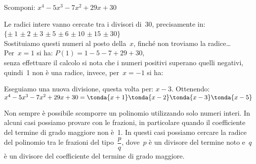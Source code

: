 \begin{esempio}{}{}
Scomponi: \(x^4-5x^3-7x^2+29x+30\)

Le radici intere vanno cercate tra i divisori di~30, precisamente in:\\
\phantom{.}\hfill
\(\{\pm~1\) \(\pm~2\) \(\pm~3\) \(\pm~5\) \(\pm~6\) \(\pm~10\)
\(\pm~15\) \(\pm~30\}\)
\hfill ~\\
Sostituiamo questi numeri al posto della~\(x\), finché non troviamo la 
radice\dots\\
Per~\(x=1\) si ha: \quad \(P(1)=1-5-7+29+30\), \\
senza effettuare il calcolo si nota 
che i numeri positivi superano quelli negativi, quindi~1 non è una radice,
invece, per~\(x=-1\) si ha:


\vspace{.5em}
Eseguiamo una nuova divisione, questa volta per: \(x-3\).
Ottenendo: \\
\(x^4-5x^3-7x^2+29x+30 = \tonda{x+1}\tonda{x-2}\tonda{x-3}\tonda{x-5}\)
\end{esempio}

Non sempre è possibile scomporre un polinomio utilizzando solo numeri
interi. In alcuni casi possiamo provare con le frazioni, in particolare
quando il coefficiente del termine di grado maggiore non è~1. In
questi casi possiamo cercare la radice del polinomio tra le frazioni
del tipo~\(\dfrac{p}{q}\), dove~\(p\) è un divisore del termine noto e~\(q\) 
è un divisore del coefficiente del termine di grado maggiore.

